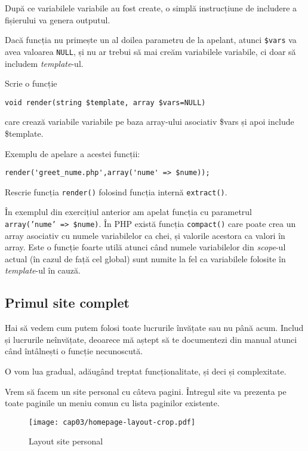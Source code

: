 După ce variabilele variabile
au fost create, o simplă instrucțiune de includere a fișierului va genera outputul.

Dacă funcția nu primește un al doilea parametru de la apelant, atunci \texttt{\$vars}
va avea valoarea \texttt{NULL}, și nu ar trebui să mai creăm variabilele variabile,
ci doar să includem \textit{template}-ul.

\begin{Exercise}[title={O funcție render()}]
\ExePart
Scrie o funcție
\begin{verbatim}
void render(string $template, array $vars=NULL)
\end{verbatim}
care crează variabile variabile pe baza array-ului asociativ \$vars
și apoi include \$template.

Exemplu de apelare a acestei funcții:
\begin{lstlisting}
render('greet_nume.php',array('nume' => $nume));
\end{lstlisting}

\ExePart

Rescrie funcția \texttt{render()} folosind funcția internă
\texttt{extract()}.
\end{Exercise}
În exemplul din exercițiul anterior am apelat funcția cu parametrul
\texttt{array('nume' => \$nume)}. În PHP există funcția \texttt{compact()}
care poate crea un array asociativ cu numele variabilelor ca chei, și
valorile acestora ca valori în array. Este o funcție foarte utilă
atunci când numele variabilelor din \textit{scope}-ul actual (în cazul de
față cel global) sunt numite la fel ca variabilele folosite în
\textit{template}-ul în cauză.


\subsection{Primul site complet}
Hai să vedem cum putem folosi toate lucrurile învățate sau nu până acum. Includ
și lucrurile neînvățate, deoarece mă aștept să te documentezi din manual
atunci când întâlnești o funcție necunoscută.

O vom lua gradual, adăugând treptat funcționalitate, și deci și complexitate.

Vrem să facem un site personal cu câteva pagini. Întregul site va prezenta
pe toate paginile un meniu comun cu lista paginilor existente. 

\begin{figure}[H]
  \centering
    \texttt{[image: cap03/homepage-layout-crop.pdf]}
  \caption{Layout site personal}
  \label{fig:layout site personal}
\end{figure}


